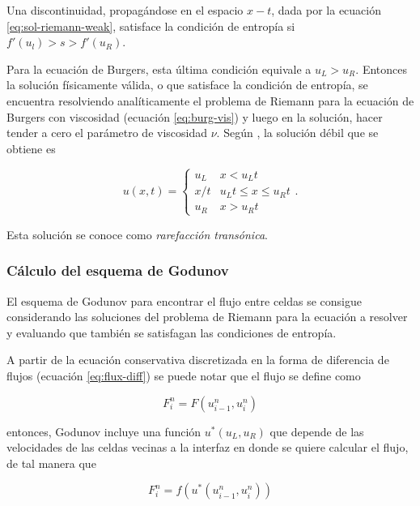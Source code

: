 \documentclass[12pt]{article}
\begin{document}
	\begin{definition}
		Una discontinuidad, propagándose en el espacio $x-t$, dada por la ecuación \ref{eq:sol-riemann-weak}, satisface la condición de entropía si $f'(u_l)>s>f'(u_R)$.
	\end{definition}
	 Para la ecuación de Burgers, esta última condición equivale a $u_L > u_R$. Entonces la solución físicamente válida, o que satisface la condición de entropía, se encuentra resolviendo analíticamente el problema de Riemann para la ecuación de Burgers con viscosidad (ecuación \ref{eq:burg-vis}) y luego en la solución, hacer tender a cero el parámetro de viscosidad $\nu$. Según \cite{Cameron}, la solución débil que se obtiene es
 	
 	\begin{equation}
 		u(x,t) =
 		\begin{cases}
 			u_{L} & x < u_{L}t \\
 			x/t & u_{L}t \leq x \leq u_{R}t \\
 			u_{R} & x > u_{R}t
 		\end{cases}.
 		\label{eq:sol-riemann-weak-rarefraction}
 	\end{equation}
 
 	Esta solución se conoce como \textit{rarefacción transónica}.
 	
 	\subsubsection{Cálculo del esquema de Godunov}
 	El esquema de Godunov para encontrar el flujo entre celdas se consigue considerando las soluciones del problema de Riemann para la ecuación a resolver y evaluando que también se satisfagan las condiciones de entropía. 
 	
 	A partir de la ecuación conservativa discretizada en la forma de diferencia de flujos (ecuación \ref{eq:flux-diff}) se puede notar que el flujo se define como
 	
 	\begin{equation}
		F_{i}^{n} = F(u_{i-1}^{n}, u_{i}^{n})
 	\end{equation}
 

 	entonces, Godunov incluye una función $u^{*}(u_L, u_R)$ que depende de las velocidades de las celdas vecinas a la interfaz en donde se quiere calcular el flujo, de tal manera que
 	
 	\begin{equation}
 		F_{i}^{n} = f(u^{*}(u_{i-1}^{n}, u_{i}^{n}))
 	\end{equation}
 	
\end{document}

